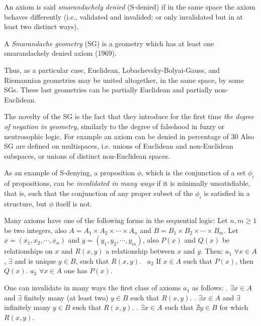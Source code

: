 \documentclass[12pt]{article}
\begin{document}
An axiom is said \emph{smarandachely denied} (S-denied) if in the same space the axiom behaves differently (i.e., validated and invalided; or only invalidated but in at least two distinct ways). 

A \emph{Smarandache geometry} (SG) is a geometry which has at least one smarandachely denied axiom (1969). 

Thus, as a particular case, Euclidean, Lobachevsky-Bolyai-Gauss, and Riemannian geometries may be united altogether, in the same space, by some SGs. These last geometries can be partially Euclidean and partially non-Euclidean.

The novelty of the SG is the fact that they introduce for the first time \emph {the degree of negation in geometry}, similarly to the degree of falsehood in fuzzy or neutrosophic logic. For example an axiom can be denied in percentage of 30%
\newline Also SG are defined on multispaces, i.e. unions of Euclidean and non-Euclidean subspaces, or unions of distinct non-Euclidean spaces. 

As an example of S-denying, a proposition $\phi$, which is the conjunction of a set $\phi_{i}$ of propositions, can be \emph{invalidated in many ways} if it is minimally unsatisfiable, that is, such that the conjunction of any proper subset of the $\phi_{i}$ is satisfied in a structure, but $\phi$ itself is not.

Many axioms have one of the following forms in the sequential logic:
\newline Let $n, m \geqslant 1$ be two integers, also $A=A_1 \times A_2 \times \cdots \times A_{n}$ and $B=B_1 \times B_2 \times \cdots \times B_{m}$.  
\newline Let $x = (x_1, x_2, \cdots, x_{n})$ and $y = (y_1, y_2, \cdots, y_{m})$, also $\textit{P}(x)$ and $\textit{Q}(x)$ be relationships on $x$ and $\textit{R}(x, y)$ a relationship between $x$ and $y$.  Then:
\newline $a_1$ \indent $\forall x \in A$, $\exists$ and is unique $y \in B$, such that $\textit{R}(x, y)$.
\newline\ $a_2$  \indent If $x \in A$ such that $\textit{P}(x)$, then $\textit{Q}(x)$.
\newline $a_3$  \indent $\forall x \in A$ one has $\textit{P}(x)$.

One can invalidate in many ways the first class of axioms $a_1$ as follows:
. \indent $\exists x \in A$ and $\exists$ finitely many (at least two) $y \in B$ such that $\textit{R}(x, y)$.
. \indent $\exists x \in A$ and $\exists$ infinitely many $y \in B$ such that $\textit{R}(x, y)$.
. \indent $\exists x \in A$ such that $\nexists y \in B$ for which $\textit{R}(x, y)$.
\end{document}
